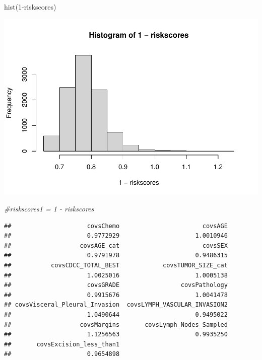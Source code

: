 \documentclass[
  11pt,
]{article}
\newenvironment{Shaded}{\begin{snugshade}}{\end{snugshade}}
\newcommand{\CommentTok}[1]{\textcolor[rgb]{0.56,0.35,0.01}{\textit{#1}}}
\newcommand{\DecValTok}[1]{\textcolor[rgb]{0.00,0.00,0.81}{#1}}
\newcommand{\FunctionTok}[1]{\textcolor[rgb]{0.00,0.00,0.00}{#1}}
\newcommand{\NormalTok}[1]{#1}
\newcommand{\OtherTok}[1]{\textcolor[rgb]{0.56,0.35,0.01}{#1}}
\newcommand{\SpecialCharTok}[1]{\textcolor[rgb]{0.00,0.00,0.00}{#1}}
\begin{document}
\begin{Shaded}
\begin{Highlighting}[]
\FunctionTok{hist}\NormalTok{(}\DecValTok{1}\SpecialCharTok{{-}}\NormalTok{riskscores)}
\end{Highlighting}
\end{Shaded}

\includegraphics{Hazard_and_Risk_plot_updated_files/figure-latex/unnamed-chunk-11-2.pdf}

\begin{Shaded}
\begin{Highlighting}[]
\CommentTok{\#riskscores1 = 1 {-} riskscores}
\end{Highlighting}
\end{Shaded}

\begin{Shaded}
\end{Shaded}

\begin{verbatim}
##                     covsChemo                       covsAGE 
##                     0.9772929                     1.0010946 
##                   covsAGE_cat                       covsSEX 
##                     0.9791978                     0.9486315 
##           covsCDCC_TOTAL_BEST            covsTUMOR_SIZE_cat 
##                     1.0025016                     1.0005138 
##                     covsGRADE                 covsPathology 
##                     0.9915676                     1.0041478 
## covsVisceral_Pleural_Invasion  covsLYMPH_VASCULAR_INVASION2 
##                     1.0490644                     0.9495022 
##                   covsMargins       covsLymph_Nodes_Sampled 
##                     1.1256563                     0.9935250 
##       covsExcision_less_than1 
##                     0.9654898
\end{verbatim}
\end{document}
